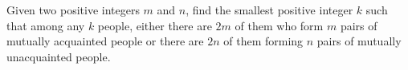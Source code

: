 Given two positive integers $m$ and $n$, find the smallest positive integer $k$ such that among any $k$ people, either there are $2m$ of them who form $m$ pairs of mutually acquainted people or there are $2n$ of them forming $n$ pairs of mutually unacquainted people.